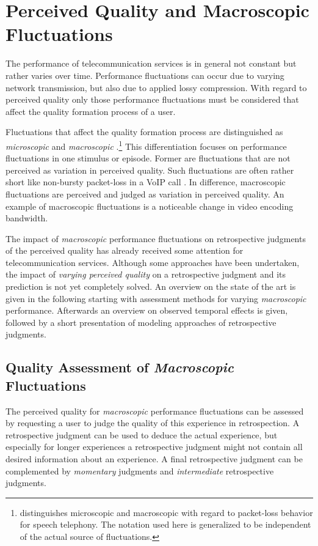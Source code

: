\section{Perceived Quality and Macroscopic Fluctuations}\label{chap:04}
The performance of telecommunication services is in general not constant but rather varies over time.
Performance fluctuations can occur due to varying network transmission, but also due to applied lossy compression.
With regard to perceived quality only those performance fluctuations must be considered that affect the quality formation process of a user.

Fluctuations that affect the quality formation process are distinguished as \emph{microscopic} and \emph{macroscopic} \citep[][p.~72]{raake_short-_2006}.\footnote{\citet{raake_short-_2006} distinguishes microscopic and macroscopic with regard to packet-loss behavior for speech telephony. The notation used here is generalized to be independent of the actual source of fluctuations.}
This differentiation focuses on performance fluctuations in one stimulus or episode.
Former are fluctuations that are not perceived as variation in perceived quality.
Such fluctuations are often rather short like non-bursty packet-loss in a \ac{VoIP} call \citep[\cf,][p.~72]{raake_short-_2006}.
In difference, macroscopic fluctuations are perceived and judged as variation in perceived quality.
An example of macroscopic fluctuations is a noticeable change in video encoding bandwidth.

The impact of \emph{macroscopic} performance fluctuations on retrospective judgments of the perceived quality has already received some attention for telecommunication services.
Although some approaches have been undertaken, the impact of \emph{varying perceived quality} on a retrospective judgment and its prediction is not yet completely solved.
An overview on the state of the art is given in the following starting with assessment methods for varying \emph{macroscopic} performance.
Afterwards an overview on observed temporal effects is given, followed by a short presentation of modeling approaches of retrospective judgments.

\subsection{Quality Assessment of \emph{Macroscopic} Fluctuations}
The perceived quality for \emph{macroscopic} performance fluctuations can be assessed by requesting a user to judge the quality of this experience in retrospection.
A retrospective judgment can be used to deduce the actual experience, but especially for longer experiences a retrospective judgment might not contain all desired information about an experience.
A final retrospective judgment can be complemented by \emph{momentary} judgments and \emph{intermediate} retrospective judgments.

